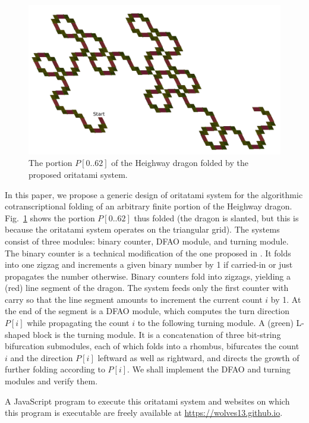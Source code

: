 \begin{figure}
\vspace*{-5mm}
\centering
\includegraphics[width=\linewidth]{pic/6bit_heighway.pdf}
\caption{The portion $P[0 .. 62]$ of the Heighway dragon folded by the proposed oritatami system.}
\label{fig:heighway6_oritatami}
\end{figure}

In this paper, we propose a generic design of oritatami system for the algorithmic cotranscriptional folding of an arbitrary finite portion of the Heighway dragon. 
Fig.~\ref{fig:heighway6_oritatami} shows the portion $P[0 .. 62]$ thus folded (the dragon is slanted, but this is because the oritatami system operates on the triangular grid). 
The systems consist of three modules: binary counter, DFAO module, and turning module. 
The binary counter is a technical modification of the one proposed in \cite{GeMeScSe2016}. 
It folds into one zigzag and increments a given binary number by 1 if carried-in or just propagates the number otherwise. 
Binary counters fold into zigzags, yielding a (red) line segment of the dragon. 
The system feeds only the first counter with carry so that the line segment amounts to increment the current count $i$ by 1. 
At the end of the segment is a DFAO module, which computes the turn direction $P[i]$ while propagating the count $i$ to the following turning module. 
A (green) L-shaped block is the turning module. 
It is a concatenation of three bit-string bifurcation submodules, each of which folds into a rhombus, bifurcates the count $i$ and the direction $P[i]$ leftward as well as rightward, and directs the growth of further folding according to $P[i]$. 
We shall implement the DFAO and turning modules and verify them. 

A JavaScript program to execute this oritatami system and websites on which this program is executable are freely available at \url{https://wolves13.github.io}. 

